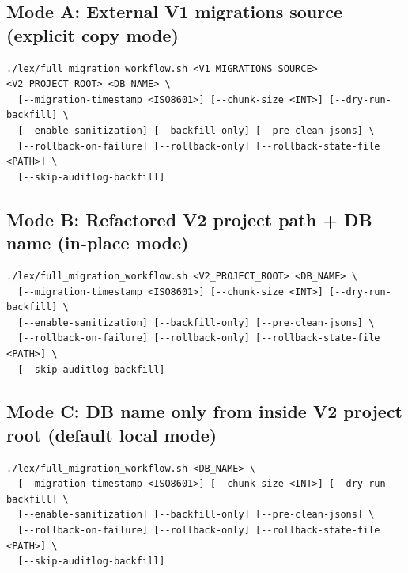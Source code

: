 \documentclass[11pt,a4paper]{article}
\begin{document}
\subsection*{Mode A: External V1 migrations source (explicit copy mode)}
\begin{verbatim}
./lex/full_migration_workflow.sh <V1_MIGRATIONS_SOURCE> <V2_PROJECT_ROOT> <DB_NAME> \
  [--migration-timestamp <ISO8601>] [--chunk-size <INT>] [--dry-run-backfill] \
  [--enable-sanitization] [--backfill-only] [--pre-clean-jsons] \
  [--rollback-on-failure] [--rollback-only] [--rollback-state-file <PATH>] \
  [--skip-auditlog-backfill]
\end{verbatim}

\subsection*{Mode B: Refactored V2 project path + DB name (in-place mode)}
\begin{verbatim}
./lex/full_migration_workflow.sh <V2_PROJECT_ROOT> <DB_NAME> \
  [--migration-timestamp <ISO8601>] [--chunk-size <INT>] [--dry-run-backfill] \
  [--enable-sanitization] [--backfill-only] [--pre-clean-jsons] \
  [--rollback-on-failure] [--rollback-only] [--rollback-state-file <PATH>] \
  [--skip-auditlog-backfill]
\end{verbatim}

\subsection*{Mode C: DB name only from inside V2 project root (default local mode)}
\begin{verbatim}
./lex/full_migration_workflow.sh <DB_NAME> \
  [--migration-timestamp <ISO8601>] [--chunk-size <INT>] [--dry-run-backfill] \
  [--enable-sanitization] [--backfill-only] [--pre-clean-jsons] \
  [--rollback-on-failure] [--rollback-only] [--rollback-state-file <PATH>] \
  [--skip-auditlog-backfill]
\end{verbatim}
\end{document}
